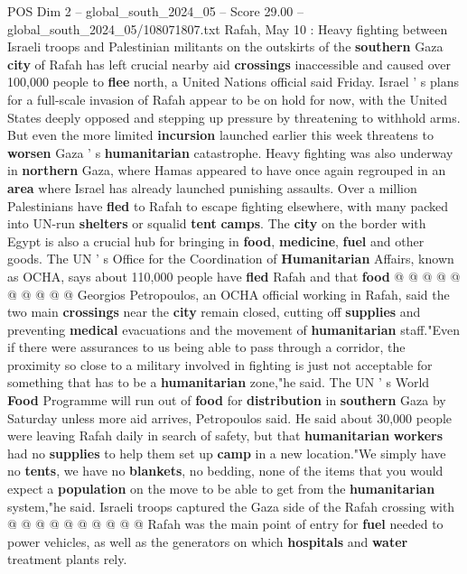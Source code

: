 \begin{textsample}{POS Dim 2 – global\_south\_2024\_05 – Score 29.00 – global\_south\_2024\_05/108071807.txt}  \label{ex:f2_pos_077}
Rafah, May 10 : Heavy fighting between Israeli troops and Palestinian militants on the outskirts of the \textbf{southern} Gaza \textbf{city} of Rafah has left crucial nearby aid \textbf{crossings} inaccessible and caused over 100,000 people to \textbf{flee} north, a United Nations official said Friday.
Israel ' s plans for a full-scale invasion of Rafah appear to be on hold for now, with the United States deeply opposed and stepping up pressure by threatening to withhold arms.
But even the more limited \textbf{incursion} launched earlier this week threatens to \textbf{worsen} Gaza ' s \textbf{humanitarian} catastrophe.
Heavy fighting was also underway in \textbf{northern} Gaza, where Hamas appeared to have once again regrouped in an \textbf{area} where Israel has already launched punishing assaults.
Over a million Palestinians have \textbf{fled} to Rafah to escape fighting elsewhere, with many packed into UN-run \textbf{shelters} or squalid \textbf{tent} \textbf{camps}.
The \textbf{city} on the border with Egypt is also a crucial hub for bringing in \textbf{food}, \textbf{medicine}, \textbf{fuel} and other goods.
The UN ' s Office for the Coordination of \textbf{Humanitarian} Affairs, known as OCHA, says about 110,000 people have \textbf{fled} Rafah and that \textbf{food} @ @ @ @ @ @ @ @ @ @ Georgios Petropoulos, an OCHA official working in Rafah, said the two main \textbf{crossings} near the \textbf{city} remain closed, cutting off \textbf{supplies} and preventing \textbf{medical} evacuations and the movement of \textbf{humanitarian} staff."Even if there were assurances to us being able to pass through a corridor, the proximity so close to a military involved in fighting is just not acceptable for something that has to be a \textbf{humanitarian} zone,"he said.
The UN ' s World \textbf{Food} Programme will run out of \textbf{food} for \textbf{distribution} in \textbf{southern} Gaza by Saturday unless more aid arrives, Petropoulos said.
He said about 30,000 people were leaving Rafah daily in search of safety, but that \textbf{humanitarian} \textbf{workers} had no \textbf{supplies} to help them set up \textbf{camp} in a new location."We simply have no \textbf{tents}, we have no \textbf{blankets}, no bedding, none of the items that you would expect a \textbf{population} on the move to be able to get from the \textbf{humanitarian} system,"he said.
Israeli troops captured the Gaza side of the Rafah crossing with @ @ @ @ @ @ @ @ @ @ Rafah was the main point of entry for \textbf{fuel} needed to power vehicles, as well as the generators on which \textbf{hospitals} and \textbf{water} treatment plants rely.

\end{textsample}
